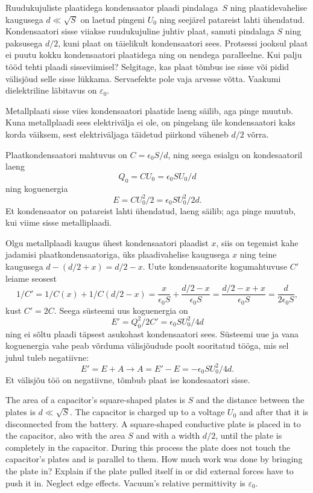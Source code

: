 
Ruudukujuliste plaatidega kondensaator plaadi pindalaga~$S$ ning plaatidevahelise
kaugusega $d \ll \sqrt{S}$ on laetud pingeni $U_0$ ning seejärel
patareist lahti ühendatud. Kondensaatori sisse viiakse ruudukujuline juhtiv
plaat, samuti pindalaga $S$ ning paksusega $d/2$, kuni plaat on täielikult
kondensaatori sees. Protsessi jooksul plaat ei puutu kokku
kondensaatori plaatidega ning on nendega paralleelne. Kui palju tööd tehti
plaadi sisseviimisel? Selgitage, kas plaat tõmbus ise sisse või pidid välisjõud
selle sisse lükkama. Servaefekte pole vaja arvesse võtta. Vaakumi dielektriline
läbitavus on $\varepsilon_0$.

\hint
Metallplaati sisse viies kondensaatori plaatide laeng säilib, aga pinge muutub. Kuna metallplaadi sees elektrivälja ei ole, on pingelang üle kondensaatori kaks korda väiksem, sest elektriväljaga täidetud piirkond väheneb $d/2$ võrra.

\solu
Plaatkondensaatori mahtuvus on $C = \epsilon_0 S / d$, ning seega esialgu on kondesaatoril laeng $$Q_0 = C U_0 = \epsilon_0 S U_0/ d$$ ning koguenergia $$E = C U_0^2 / 2 = \epsilon_0 S U_0^2/ 2 d.$$Et kondensaator on patareist lahti ühendatud, laeng säilib; aga pinge muutub, kui viime sisse metalliplaadi.

Olgu metallplaadi kaugus ühest kondensaatori plaadist $x$, siis on tegemist kahe jadamisi plaatkondensaatoriga, üks plaadivahelise kaugusega $x$ ning teine kaugusega $d - (d/2 + x) = d/2 - x$. Uute kondensaatorite kogumahtuvuse $C'$ leiame seosest $$1/C' = 1/C(x) + 1/C(d/2-x) = \frac{x}{\epsilon_0 S} + \frac{d/2 - x}{\epsilon_0 S} = \frac{d/2 - x + x}{\epsilon_0 S} = \frac{d}{2 \epsilon_0 S},$$kust $C' = 2C$. Seega süsteemi uus koguenergia on $$E' = Q_0^2 / 2C' = \epsilon_0 S U_0^2/ 4 d$$ ning ei sõltu plaadi täpsest asukohast kondensaatori sees. Süsteemi uue ja vana koguenergia vahe peab võrduma välisjõudude poolt sooritatud tööga, mis sel juhul tuleb negatiivne:
$$E' = E + A \rightarrow A = E' - E = - \epsilon_0 S U_0^2/ 4 d.$$
Et välisjõu töö on negatiivne, tõmbub plaat ise kondesaatori sisse.

The area of a capacitor’s square-shaped plates is $S$ and the distance between the plates is $d \ll \sqrt{S}$. The capacitor is charged up to a voltage $U_0$ and after that it is disconnected from the battery. A square-shaped conductive plate is placed in to the capacitor, also with the area $S$ and with a width $d/2$, until the plate is completely in the capacitor. During this process the plate does not touch the capacitor’s plates and is parallel to them. How much work was done by bringing the plate in? Explain if the plate pulled itself in or did external forces have to push it in. Neglect edge effects. Vacuum’s relative permittivity is $\varepsilon_0$.

